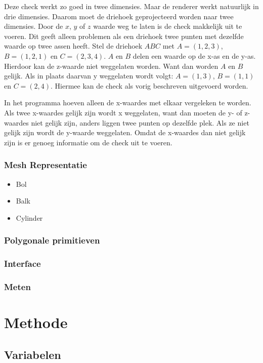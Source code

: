 \documentclass[12pt, a4paper]{article}
\begin{document}
Deze check werkt zo goed in twee dimensies. Maar de renderer werkt natuurlijk in drie dimensies. Daarom moet de driehoek geprojecteerd worden naar twee dimensies. Door de $x$, $y$ of $z$ waarde weg te laten is de check makkelijk uit te voeren. Dit geeft alleen problemen als een driehoek twee punten met dezelfde waarde op twee assen heeft. Stel de driehoek $ABC$ met $A=(1,2,3)$, $B=(1,2,1)$ en $C=(2,3,4)$. $A$ en $B$ delen een waarde op de x-as en de y-as. Hierdoor kan de z-waarde niet weggelaten worden. Want dan worden $A$ en $B$ gelijk. Als in plaats daarvan y weggelaten wordt volgt: $A=(1,3)$, $B=(1,1)$ en $C=(2,4)$. Hiermee kan de check als vorig beschreven uitgevoerd worden.

In het programma hoeven alleen de x-waardes met elkaar vergeleken te worden. Als twee x-waardes gelijk zijn wordt x weggelaten, want dan moeten de y- of z-waardes niet gelijk zijn, anders liggen twee punten op dezelfde plek. Als ze niet gelijk zijn wordt de y-waarde weggelaten. Omdat de x-waardes dan niet gelijk zijn is er genoeg informatie om de check uit te voeren.

\subsubsection{Mesh Representatie}

\begin{itemize}
	\item Bol
	\item Balk
	\item Cylinder
\end{itemize}\subsubsection{Polygonale primitieven}


\subsubsection{Interface}
\subsubsection{Meten}
\clearpage
\section{Methode}
\subsection{Variabelen}
\end{document}
